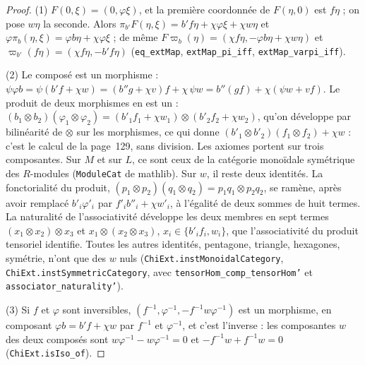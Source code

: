 \begin{proof}
(1) $F(0, \xi) = (0, \varphi\xi)$, et la première coordonnée de $F(\eta, 0)$ est $f\eta$ ; on pose $w\eta$ la seconde. Alors $\pi_{b'}F(\eta, \xi) = b'f\eta + \chi\varphi\xi + \chi w\eta$ et $\varphi\pi_b(\eta, \xi) = \varphi b\eta + \chi\varphi\xi$ ; de même $F\varpi_b(\eta) = (\chi f\eta, -\varphi b\eta + \chi w\eta)$ et $\varpi_{b'}(f\eta) = (\chi f\eta, -b'f\eta)$ (\texttt{eq\_extMap}, \texttt{extMap\_pi\_iff}, \texttt{extMap\_varpi\_iff}).

(2) Le composé est un morphisme : $\psi\varphi b = \psi(b'f + \chi w) = (b''g + \chi v)f + \chi\,\psi w = b''(gf) + \chi(\psi w + vf)$. Le produit de deux morphismes en est un : $(b_1 \otimes b_2)(\varphi_1 \otimes \varphi_2) = (b'_1f_1 + \chi w_1) \otimes (b'_2f_2 + \chi w_2)$, qu'on développe par bilinéarité de $\otimes$ sur les morphismes, ce qui donne $(b'_1 \otimes b'_2)(f_1 \otimes f_2) + \chi w$ : c'est le calcul de la page~129, sans division. Les axiomes portent sur trois composantes. Sur $M$ et sur $L$, ce sont ceux de la catégorie monoïdale symétrique des $R$-modules (\texttt{ModuleCat} de mathlib). Sur $w$, il reste deux identités. La fonctorialité du produit, $(p_1 \otimes p_2)(q_1 \otimes q_2) = p_1q_1 \otimes p_2q_2$, se ramène, après avoir remplacé $b'_i\varphi'_i$ par $f'_ib''_i + \chi w'_i$, à l'égalité de deux sommes de huit termes. La naturalité de l'associativité développe les deux membres en sept termes $(x_1 \otimes x_2) \otimes x_3$ et $x_1 \otimes (x_2 \otimes x_3)$, $x_i \in \{b'_if_i, w_i\}$, que l'associativité du produit tensoriel identifie. Toutes les autres identités, pentagone, triangle, hexagones, symétrie, n'ont que des $w$ nuls (\texttt{ChiExt.\allowbreak{}instMonoidalCategory}, \texttt{ChiExt.\allowbreak{}instSymmetricCategory}, avec \texttt{tensorHom\_comp\_tensorHom'} et \texttt{associator\_naturality'}).

(3) Si $f$ et $\varphi$ sont inversibles, $(f^{-1}, \varphi^{-1}, -f^{-1}w\varphi^{-1})$ est un morphisme, en composant $\varphi b = b'f + \chi w$ par $f^{-1}$ et $\varphi^{-1}$, et c'est l'inverse : les composantes $w$ des deux composés sont $w\varphi^{-1} - w\varphi^{-1} = 0$ et $-f^{-1}w + f^{-1}w = 0$ (\texttt{ChiExt.\allowbreak{}isIso\_of}).


\end{proof}
